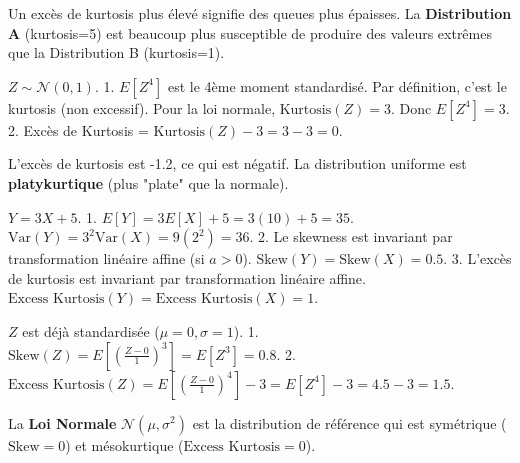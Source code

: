 \begin{correctionbox}
Un excès de kurtosis plus élevé signifie des queues plus épaisses.
La \textbf{Distribution A} (kurtosis=5) est beaucoup plus susceptible de produire des valeurs extrêmes que la Distribution B (kurtosis=1).
\end{correctionbox}

\begin{correctionbox}
$Z \sim \mathcal{N}(0, 1)$.
1.  $E[Z^4]$ est le 4ème moment standardisé. Par définition, c'est le kurtosis (non excessif). Pour la loi normale, $\text{Kurtosis}(Z) = 3$. Donc $E[Z^4] = 3$.
2.  Excès de Kurtosis = $\text{Kurtosis}(Z) - 3 = 3 - 3 = 0$.
\end{correctionbox}

\begin{correctionbox}
L'excès de kurtosis est -1.2, ce qui est négatif.
La distribution uniforme est \textbf{platykurtique} (plus "plate" que la normale).
\end{correctionbox}


\begin{correctionbox}
$Y = 3X + 5$.
1.  $E[Y] = 3E[X] + 5 = 3(10) + 5 = 35$.
    $\text{Var}(Y) = 3^2 \text{Var}(X) = 9 (2^2) = 36$.
2.  Le skewness est invariant par transformation linéaire affine (si $a>0$). $\text{Skew}(Y) = \text{Skew}(X) = 0.5$.
3.  L'excès de kurtosis est invariant par transformation linéaire affine. $\text{Excess Kurtosis}(Y) = \text{Excess Kurtosis}(X) = 1$.
\end{correctionbox}

\begin{correctionbox}
$Z$ est déjà standardisée ($\mu=0, \sigma=1$).
1.  $\text{Skew}(Z) = E\left[ \left( \frac{Z - 0}{1} \right)^3 \right] = E[Z^3] = 0.8$.
2.  $\text{Excess Kurtosis}(Z) = E\left[ \left( \frac{Z - 0}{1} \right)^4 \right] - 3 = E[Z^4] - 3 = 4.5 - 3 = 1.5$.
\end{correctionbox}

\begin{correctionbox}
La \textbf{Loi Normale} $\mathcal{N}(\mu, \sigma^2)$ est la distribution de référence qui est symétrique ($\text{Skew}=0$) et mésokurtique ($\text{Excess Kurtosis}=0$).
\end{correctionbox}

